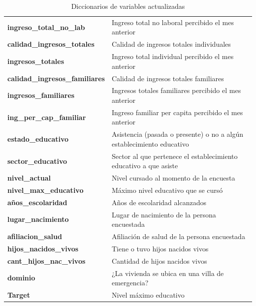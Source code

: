 \documentclass[a4paper]{article}
\begin{document}
\begin{table}[H]
\begin{tabular}{ll}
        \textbf{ingreso\_total\_no\_lab}       & Ingreso total no laboral percibido el mes anterior \\ 
        \textbf{calidad\_ingresos\_totales}    & Calidad de ingresos totales individuales \\ 
        \textbf{ingresos\_totales}             & Ingreso total individual percibido el mes anterior \\
        \textbf{calidad\_ingresos\_familiares} & Calidad de ingresos totales familiares \\ 
        \textbf{ingresos\_familiares}          & Ingresos totales familiares percibido el mes anterior \\ 
        \textbf{ing\_per\_cap\_familiar}       & Ingreso familiar per capita percibido el mes anterior \\ 
        \textbf{estado\_educativo}             & Asistencia (pasada o presente) o no a algún establecimiento educativo \\ 
        \textbf{sector\_educativo}             & Sector al que pertenece el establecimiento educativo a que asiste \\     
        \textbf{nivel\_actual}                 & Nivel cursado al momento de la encuesta \\                               
        \textbf{nivel\_max\_educativo}         & Máximo nivel educativo que se cursó \\                                   
        \textbf{años\_escolaridad}             & Años de escolaridad alcanzados \\                                        
        \textbf{lugar\_nacimiento}             & Lugar de nacimiento de la persona encuestada \\                          
        \textbf{afiliacion\_salud}             & Afiliación de salud de la persona encuestada \\                          
        \textbf{hijos\_nacidos\_vivos}         & Tiene o tuvo hijos nacidos vivos \\                                      
        \textbf{cant\_hijos\_nac\_vivos}       & Cantidad de hijos nacidos vivos \\                                       
        \textbf{dominio}                       & ¿La vivienda se ubica en una villa de emergencia? \\                     
        \textbf{Target}                        & Nivel máximo educativo \\  
        \midrule                                         
    \end{tabular}
    \caption{Diccionarios de variables actualizadas}
    \label{dictionary}
    \end{table}
 
\end{document}
